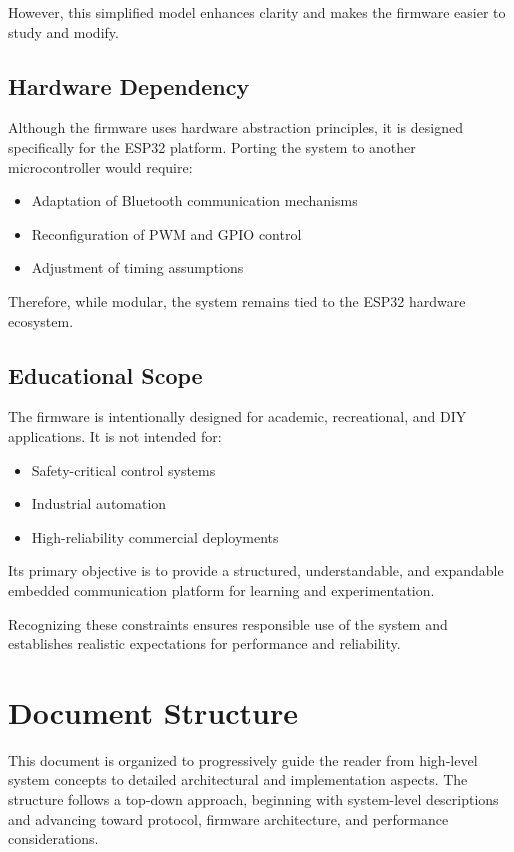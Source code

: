 However, this simplified model enhances clarity and makes the firmware easier to study and modify.

\subsection{Hardware Dependency}

Although the firmware uses hardware abstraction principles, it is designed specifically for the ESP32 platform. Porting the system to another microcontroller would require:

\begin{itemize}
	\item Adaptation of Bluetooth communication mechanisms
	\item Reconfiguration of PWM and GPIO control
	\item Adjustment of timing assumptions
\end{itemize}

Therefore, while modular, the system remains tied to the ESP32 hardware ecosystem.

\subsection{Educational Scope}

The firmware is intentionally designed for academic, recreational, and DIY applications. It is not intended for:

\begin{itemize}
	\item Safety-critical control systems
	\item Industrial automation
	\item High-reliability commercial deployments
\end{itemize}

Its primary objective is to provide a structured, understandable, and expandable embedded communication platform for learning and experimentation.

Recognizing these constraints ensures responsible use of the system and establishes realistic expectations for performance and reliability.


\section{Document Structure}

This document is organized to progressively guide the reader from high-level system concepts to detailed architectural and implementation aspects. The structure follows a top-down approach, beginning with system-level descriptions and advancing toward protocol, firmware architecture, and performance considerations.


